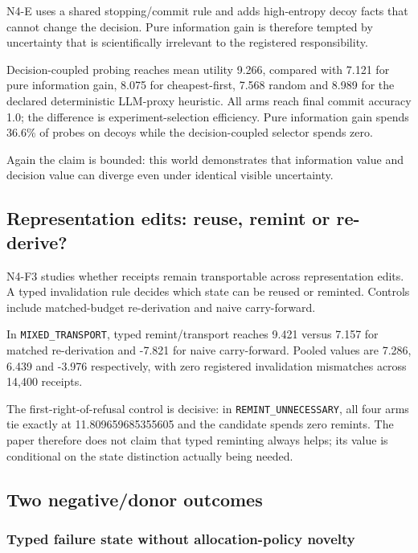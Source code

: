 \documentclass[10pt]{article}
\begin{document}
N4-E uses a shared stopping/commit rule and adds high-entropy decoy
facts that cannot change the decision. Pure information gain is
therefore tempted by uncertainty that is scientifically irrelevant to
the registered responsibility.

Decision-coupled probing reaches mean utility 9.266, compared with 7.121
for pure information gain, 8.075 for cheapest-first, 7.568 random and
8.989 for the declared deterministic LLM-proxy heuristic. All arms reach
final commit accuracy 1.0; the difference is experiment-selection
efficiency. Pure information gain spends 36.6\% of probes on decoys
while the decision-coupled selector spends zero.

Again the claim is bounded: this world demonstrates that information
value and decision value can diverge even under identical visible
uncertainty.

\hypertarget{representation-edits-reuse-remint-or-re-derive}{%
\subsection{Representation edits: reuse, remint or
re-derive?}\label{representation-edits-reuse-remint-or-re-derive}}

N4-F3 studies whether receipts remain transportable across
representation edits. A typed invalidation rule decides which state can
be reused or reminted. Controls include matched-budget re-derivation and
naive carry-forward.

In \texttt{MIXED\_TRANSPORT}, typed remint/transport reaches 9.421
versus 7.157 for matched re-derivation and -7.821 for naive
carry-forward. Pooled values are 7.286, 6.439 and -3.976 respectively,
with zero registered invalidation mismatches across 14,400 receipts.

The first-right-of-refusal control is decisive: in
\texttt{REMINT\_UNNECESSARY}, all four arms tie exactly at
11.809659685355605 and the candidate spends zero remints. The paper
therefore does not claim that typed reminting always helps; its value is
conditional on the state distinction actually being needed.

\hypertarget{two-negativedonor-outcomes}{%
\subsection{Two negative/donor
outcomes}\label{two-negativedonor-outcomes}}

\hypertarget{typed-failure-state-without-allocation-policy-novelty}{%
\subsubsection{Typed failure state without allocation-policy
novelty}\label{typed-failure-state-without-allocation-policy-novelty}}
\end{document}
